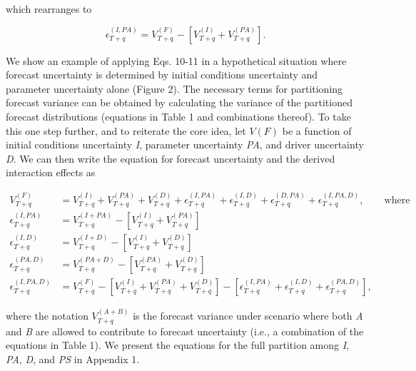 \documentclass[12pt,]{article}
\begin{document}
\noindent{}which rearranges to

\begin{equation}
\epsilon_{T+q}^{(I,PA)} = V^{(F)}_{T+q} - \left[ V^{(I)}_{T+q} + V^{(PA)}_{T+q} \right].
\end{equation}

\noindent{}We show an example of applying Eqs. 10-11 in a hypothetical
situation where forecast uncertainty is determined by initial conditions
uncertainty and parameter uncertainty alone (Figure 2). The necessary
terms for partitioning forecast variance can be obtained by calculating
the variance of the partitioned forecast distributions (equations in
Table 1 and combinations thereof). To take this one step further, and to
reiterate the core idea, let \(V(F)\) be a function of initial
conditions uncertainty \emph{I}, parameter uncertainty \emph{PA}, and
driver uncertainty \emph{D}. We can then write the equation for forecast
uncertainty and the derived interaction effects as

\begin{align}
V^{(F)}_{T+q} &= V^{(I)}_{T+q} + V^{(PA)}_{T+q} + V^{(D)}_{T+q} + \epsilon^{(I,PA)}_{T+q} + \epsilon^{(I,D)}_{T+q} + \epsilon^{(D,PA)}_{T+q} + \epsilon^{(I,PA,D)}_{T+q}, \qquad \text{where} \\
\epsilon^{(I,PA)}_{T+q} &= V^{(I+PA)}_{T+q} - \left[V^{(I)}_{T+q} + V^{(PA)}_{T+q}\right] \\
\epsilon^{(I,D)}_{T+q} &= V^{(I+D)}_{T+q} - \left[V^{(I)}_{T+q} + V^{(D)}_{T+q}\right] \\
\epsilon^{(PA,D)}_{T+q} &= V^{(PA+D)}_{T+q} - \left[V^{(PA)}_{T+q} + V^{(D)}_{T+q}\right] \\
\epsilon^{(I,PA,D)}_{T+q} &= V^{(F)}_{T+q} - \left[V^{(I)}_{T+q} + V^{(PA)}_{T+q} + V^{(D)}_{T+q}\right] - \left[\epsilon^{(I,PA)}_{T+q} + \epsilon^{(I,D)}_{T+q} + \epsilon^{(PA,D)}_{T+q} \right],
\end{align}

\noindent{}where the notation \(V^{(A+B)}_{T+q}\) is the forecast
variance under scenario where both \emph{A} and \emph{B} are allowed to
contribute to forecast uncertainty (i.e., a combination of the equations
in Table 1). We present the equations for the full partition among
\emph{I}, \emph{PA}, \emph{D}, and \emph{PS} in Appendix 1.
\end{document}
